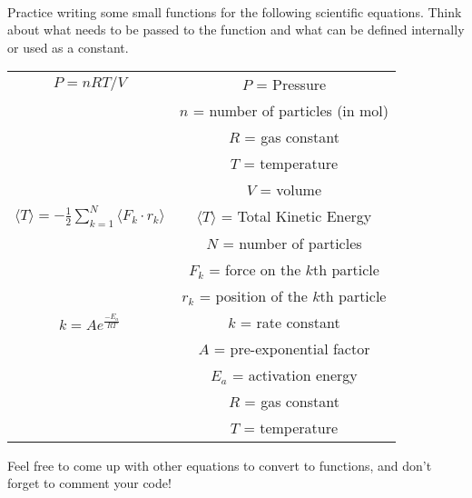 \begin{homework}
\paragraph{}Practice writing some small functions for the following scientific equations. Think about what needs to be passed to the function and what can be defined internally or used as a constant.

\begin{center}
\begin{tabular}{|c|c|}
\hline
$P = nRT/V$ & $P$ = Pressure \\
& $n$ = number of particles (in mol)\\
& $R$ = gas constant \\
& $T$ = temperature \\
& $V$ = volume \\ \hline

$\langle T\rangle = -\frac{1}{2}\sum\limits_{k=1}^{N}\langle F_k \cdot r_k \rangle$ & 
$\langle T\rangle$ = Total Kinetic Energy \\
& $N$ = number of particles \\
& $F_k$ = force on the $k$th particle \\
& $r_k$ = position of the $k$th particle \\ \hline

$k = Ae^{\frac{-E_a}{RT}}$ & $k$ = rate constant \\
& $A$ = pre-exponential factor \\
& $E_a$ = activation energy \\
& $R$ = gas constant \\
& $T$ = temperature \\

\hline
\end{tabular}
\end{center}

Feel free to come up with other equations to convert to functions, and don't forget to comment your code!
\end{homework}
